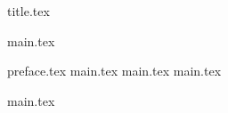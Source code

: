 



{title.tex}

\clearpage
\setcounter{page}{2}

{main.tex}

\tableofcontents
\thispagestyle{empty}

\clearpage
\pagestyle{fancy}

\clearpage

{preface.tex}
{main.tex}
{main.tex}
{main.tex}

\clearpage
{}
{}
\renewcommand\bibname{Перелік посилань}


{main.tex}


